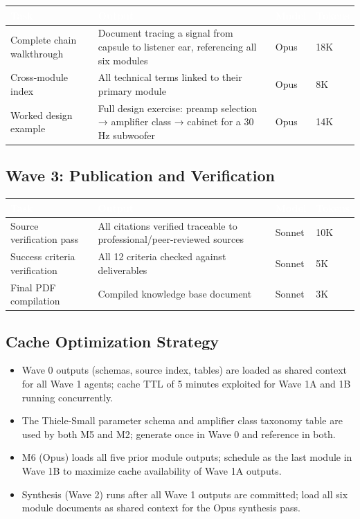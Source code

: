 \documentclass[11pt,letterpaper]{article}
\newcommand{\tableheader}[1]{\textbf{\sffamily\textcolor{white}{#1}}}
\begin{document}
\begin{center}
\begin{tabularx}{\textwidth}{L{4cm}XC{2cm}C{1.5cm}}
\toprule
{}
\tableheader{Task} & \tableheader{Output} & \tableheader{Model} & \tableheader{Tokens} \\
\midrule
Complete chain walkthrough & Document tracing a signal from capsule to listener ear, referencing all six modules & Opus & 18K \\
Cross-module index & All technical terms linked to their primary module & Opus & 8K \\
Worked design example & Full design exercise: preamp selection → amplifier class → cabinet for a 30 Hz subwoofer & Opus & 14K \\
\bottomrule
\end{tabularx}
\end{center}

\subsection{Wave 3: Publication and Verification}

\begin{center}
\begin{tabularx}{\textwidth}{L{4cm}XC{2cm}C{1.5cm}}
\toprule
{}
\tableheader{Task} & \tableheader{Output} & \tableheader{Model} & \tableheader{Tokens} \\
\midrule
Source verification pass & All citations verified traceable to professional/peer-reviewed sources & Sonnet & 10K \\
Success criteria verification & All 12 criteria checked against deliverables & Sonnet & 5K \\
Final PDF compilation & Compiled knowledge base document & Sonnet & 3K \\
\bottomrule
\end{tabularx}
\end{center}

\subsection{Cache Optimization Strategy}

\begin{itemize}
  \item Wave 0 outputs (schemas, source index, tables) are loaded as shared context for all Wave 1 agents; cache TTL of 5 minutes exploited for Wave 1A and 1B running concurrently.
  \item The Thiele-Small parameter schema and amplifier class taxonomy table are used by both M5 and M2; generate once in Wave 0 and reference in both.
  \item M6 (Opus) loads all five prior module outputs; schedule as the last module in Wave 1B to maximize cache availability of Wave 1A outputs.
  \item Synthesis (Wave 2) runs after all Wave 1 outputs are committed; load all six module documents as shared context for the Opus synthesis pass.
\end{itemize}
\end{document}
